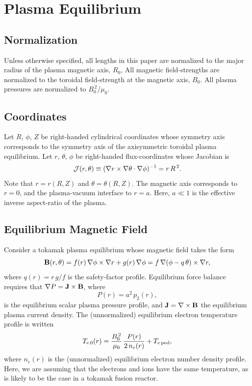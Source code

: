 \documentclass[12pt,prb,aps]{revtex4-1}
\begin{document}
\section{Plasma Equilibrium}\label{s2}
\subsection{Normalization}\label{norm}
Unless otherwise specified, all lengths in this paper are normalized to  the major radius of the plasma magnetic axis, $R_0$, All  magnetic field-strengths
are normalized to the  toroidal field-strength at the magnetic axis, $B_0$. All plasma pressures are normalized to $B_0^{\,2}/\mu_0$.

\subsection{Coordinates}\label{coord}
Let $R$, $\phi$, $Z$ be right-handed cylindrical coordinates whose symmetry axis corresponds to the symmetry axis of the axisymmetric toroidal plasma equilibrium.
Let $r$, $\theta$, $\phi$ be right-handed flux-coordinates whose
Jacobian is
\begin{equation}\label{jac}
{\cal J}(r,\theta)\equiv (\nabla r\times \nabla\theta\cdot\nabla\phi)^{-1}= r\,R^{\,2}.
\end{equation}
Note that $r=r(R,Z)$ and $\theta=\theta(R,Z)$. 
The magnetic axis corresponds to $r=0$, and the plasma-vacuum interface to $r=a$. Here, $a\ll 1$ is the effective inverse aspect-ratio of the plasma. 

\subsection{Equilibrium Magnetic Field}\label{equilb}
Consider a tokamak plasma equilibrium whose magnetic field takes the form
\begin{equation}
{\bf B}(r,\theta) = f(r)\,\nabla\phi\times \nabla r + g(r)\,\nabla\phi = f\,\nabla(\phi-q\,\theta)\times \nabla r,
\end{equation}
where
$q(r) = r\,g/f$ is the safety-factor profile.
Equilibrium force balance requires that
$ \nabla P={\bf J}\times {\bf B}$, 
where 
\begin{equation}
P(r)= a^2\,p_2(r),
\end{equation}
 is the equilibrium scalar plasma pressure profile, and ${\bf J}=\nabla\times {\bf B}$ the equilibrium plasma current density. 
 The (unnormalized) equilibrium electron temperature profile is written
 \begin{equation}
 T_{e\,0}(r) = \frac{B_0^{\,2}}{\mu_0}\,\frac{P(r)}{2\,n_e(r)} + T_{e\,{\rm ped}},
 \end{equation}
 where $n_e(r)$ is the (unnormalized) equilibrium electron number density profile. Here, we are assuming that the electrons and ions have the same
 temperature, as is likely to be the case in a tokamak fusion reactor. 
\end{document}
